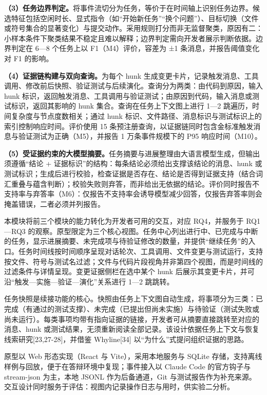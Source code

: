 \textbf{（3）任务边界判定。}将事件流切分为任务，等价于在时间轴上识别任务边界。候选特征包括空闲时长、显式指令（如“开始新任务”“换个问题”）、目标切换（文件或符号集合的显著变化）与提交动作。采用规则打分而非无监督聚类，原因有二：小样本条件下聚类结果不稳定且难以解释；边界判定需向开发者展示判断依据。边界判定在 6—8 个任务上以 F1（M4）评价，容差为 ±1 条消息，并报告阈值变化对 F1 的影响。

\textbf{（4）证据链构建与双向查询。}为每个 hunk 生成变更卡片，记录触发消息、工具调用、修改前后快照、验证测试与后续演化。查询分为两类：由代码到原因，输入 hunk 标识，返回触发消息、工具调用与验证测试；由原因到代码，输入消息或测试标识，返回其影响的 hunk 集合。查询在任务上下文图上进行 1—2 跳遍历，时间复杂度与节点度数相关；通过 hunk 标识、文件路径、消息标识与测试标识上的索引控制响应时间。评价使用 15 条预注册查询，以证据链同时包含金标准触发消息与验证测试为正确（M5），并报告 1 万条事件规模下的 P95 响应时间（M10）。

\textbf{（5）受证据约束的大模型摘要。}任务摘要与进展整理由大语言模型生成，但输出须遵循“结论 + 证据标识”的结构：每条结论必须给出支撑该结论的消息、hunk 或测试标识；生成后进行校验，检查证据是否存在、结论是否得到证据支持（结合词汇重叠与蕴含判断）；校验失败则弃答，而非给出无依据的结论。评价同时报告不支持率与弃答率（M6）：仅报告不支持率会诱导模型减少回答，仅报告弃答率则会掩盖错误，二者必须并列报告。


本模块将前三个模块的能力转化为开发者可用的交互，对应 RQ4，并服务于 RQ1—RQ3 的观察。原型限定为三个核心视图。任务中心列出进行中、已完成与中断的任务，显示进展摘要、未完成项与待验证修改的数量，并提供“继续任务”的入口。任务时间线按时间顺序呈现对话轮次、工具调用、文件变更与测试运行，支持按文件、符号与测试名过滤；文件与代码片段视角并非第四个视图，而是时间线的过滤条件与详情呈现。变更证据侧栏在选中某个 hunk 后展示其变更卡片，并可沿“触发—实施—验证—演化”关系进行 1—2 跳跳转。

任务快照是续接功能的核心。快照由任务上下文图自动生成，将事项分为三类：已完成（有通过的测试支撑）、未完成（已提出但尚未实施）与待验证（测试失败或尚未运行）。每类事项均带有指向证据的链接，开发者可从摘要直接跳转至对应的消息、hunk 或测试结果，无须重新阅读全部记录。该设计依据任务上下文与恢复线索研究[23,27-28]，并借鉴 Whyline[34] 以“为什么”式提问组织证据的思路。

原型以 Web 形态实现（React 与 Vite），采用本地服务与 SQLite 存储，支持离线样例与回放，便于在答辩环境中复现；事件接入以 Claude Code 的官方钩子与 stream-json 为主，本地 JSONL 作为后备通道，Git 与测试报告作为补充来源。交互设计同时服务于评估：视图内记录操作日志与用时，供实验二分析。


